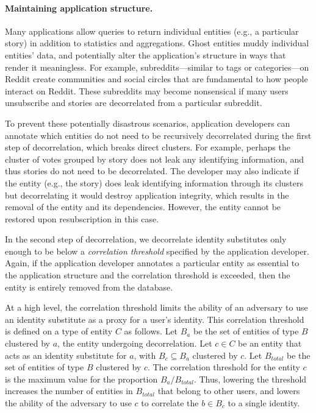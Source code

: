 
\paragraph{Maintaining application structure.}
Many applications allow queries to return individual entities (e.g., a particular story) in addition
to statistics and aggregations. Ghost entities muddy individual entities' data, and potentially
alter the application's structure in ways that render it meaningless. For example,
subreddits---similar to tags or categories---on Reddit create communities and social circles 
that are fundamental to how people interact on Reddit.
These subreddits may become nonsensical if many users unsubscribe and stories are
decorrelated from a particular subreddit.

To prevent these potentially disastrous scenarios, application developers can annotate which
entities do not need to be recursively decorrelated during the first step of decorrelation, which
breaks direct clusters. For example, perhaps the cluster of votes grouped by story does not leak any
identifying information, and thus stories do not need to be decorrelated.  The developer may also
indicate if the entity (e.g., the
story) does leak identifying information through its clusters but decorrelating it would destroy
application integrity, which results in the removal of the entity and its dependencies.
However, the entity cannot be restored upon resubscription in this case.

In the second step of decorrelation, we decorrelate identity substitutes only enough to be below a
\emph{correlation threshold} specified by the application developer. Again, if the application
developer annotates a particular entity as essential to the application structure and the
correlation threshold is exceeded, then the entity is entirely removed from the database. 

At a high level, the correlation threshold limits the ability of an adversary to use an identity
substitute as a proxy for a user's identity.  This correlation threshold is defined on a type of
entity $C$ as follows. Let $B_a$ be the set of entities of type $B$ clustered by $a$, the entity
undergoing decorrelation.  Let $c \in C$ be an entity that acts as an identity substitute for $a$, with
$B_c \subseteq B_a$ clustered by $c$. Let $B_{total}$ be the set of entities of type $B$ clustered
by $c$. The correlation threshold for the entity $c$ is the maximum value for the proportion $B_a /
B_{total}$. Thus, lowering the threshold increases the number of entities in $B_{total}$ that belong
to other users, and lowers the ability of the adversary to use $c$ to correlate the $b \in B_{c}$ to
a single identity.

